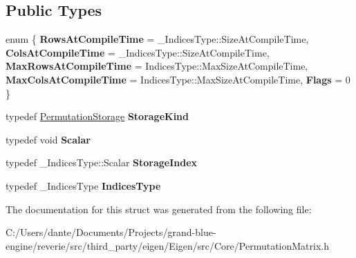 \subsection*{Public Types}
\begin{DoxyCompactItemize}
\item 
\mbox{\label{struct_eigen_1_1internal_1_1traits_3_01_permutation_wrapper_3_01___indices_type_01_4_01_4_a46a363e8ff028634f6f4facb04ee0c4f}} 
enum \{ \newline
{\bfseries Rows\+At\+Compile\+Time} = \+\_\+\+Indices\+Type\+::Size\+At\+Compile\+Time, 
{\bfseries Cols\+At\+Compile\+Time} = \+\_\+\+Indices\+Type\+::Size\+At\+Compile\+Time, 
{\bfseries Max\+Rows\+At\+Compile\+Time} = Indices\+Type\+::Max\+Size\+At\+Compile\+Time, 
{\bfseries Max\+Cols\+At\+Compile\+Time} = Indices\+Type\+::Max\+Size\+At\+Compile\+Time, 
\newline
{\bfseries Flags} = 0
 \}
\item 
\mbox{\label{struct_eigen_1_1internal_1_1traits_3_01_permutation_wrapper_3_01___indices_type_01_4_01_4_a73b667d33aed32c6a3d8cb74b9f0c8f7}} 
typedef \mbox{\hyperlink{struct_eigen_1_1_permutation_storage}{Permutation\+Storage}} {\bfseries Storage\+Kind}
\item 
\mbox{\label{struct_eigen_1_1internal_1_1traits_3_01_permutation_wrapper_3_01___indices_type_01_4_01_4_a446f600704e244d9c79bc5a84ca45aee}} 
typedef void {\bfseries Scalar}
\item 
\mbox{\label{struct_eigen_1_1internal_1_1traits_3_01_permutation_wrapper_3_01___indices_type_01_4_01_4_af79687e22c4aecd116b32a9875f165ec}} 
typedef \+\_\+\+Indices\+Type\+::\+Scalar {\bfseries Storage\+Index}
\item 
\mbox{\label{struct_eigen_1_1internal_1_1traits_3_01_permutation_wrapper_3_01___indices_type_01_4_01_4_a6cd4b5d974540dface40b94fd8918097}} 
typedef \+\_\+\+Indices\+Type {\bfseries Indices\+Type}
\end{DoxyCompactItemize}


The documentation for this struct was generated from the following file\+:\begin{DoxyCompactItemize}
\item 
C\+:/\+Users/dante/\+Documents/\+Projects/grand-\/blue-\/engine/reverie/src/third\+\_\+party/eigen/\+Eigen/src/\+Core/Permutation\+Matrix.\+h\end{DoxyCompactItemize}
